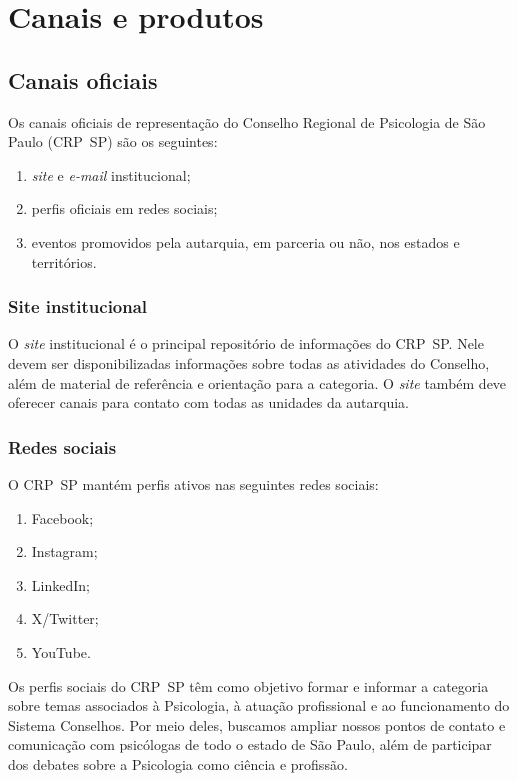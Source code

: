 \chapter{Canais e produtos}

\section{Canais oficiais}

Os canais oficiais de representação do Conselho Regional de Psicologia
de São Paulo (CRP~SP) são os seguintes:

\begin{enumerate}

  \item
        \emph{site} e \emph{e-mail} institucional;
  \item
        perfis oficiais em redes sociais;
  \item
        eventos promovidos pela autarquia, em parceria ou não, nos estados e
        territórios.
\end{enumerate}

\subsection{Site institucional}

O \emph{site} institucional é o principal repositório de informações do
CRP~SP. Nele devem ser disponibilizadas informações sobre todas as
atividades do Conselho, além de material de referência e orientação para
a categoria. O \emph{site} também deve oferecer canais para contato com
todas as unidades da autarquia.

\subsection{Redes sociais}

O CRP~SP mantém perfis ativos nas seguintes redes sociais:

\begin{enumerate}

  \item
        Facebook;
  \item
        Instagram;
  \item
        LinkedIn;
  \item
        X/Twitter;
  \item
        YouTube.
\end{enumerate}

Os perfis sociais do CRP~SP têm como objetivo formar e informar a
categoria sobre temas associados à Psicologia, à atuação profissional e
ao funcionamento do Sistema Conselhos. Por meio deles, buscamos ampliar
nossos pontos de contato e comunicação com psicólogas de todo o estado
de São Paulo, além de participar dos debates sobre a Psicologia como
ciência e profissão.


